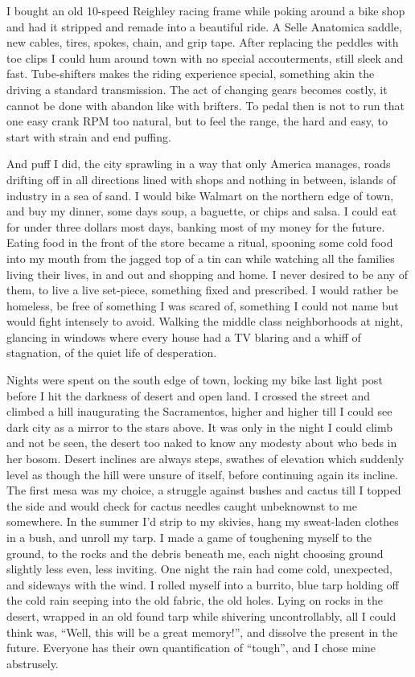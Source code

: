 \documentclass[ebook, 10pt, openright, onecolumn]{memoir}
\begin{document}
I bought an old 10-speed Reighley racing frame while poking around a bike shop
and had it stripped and remade into a beautiful ride.  A Selle Anatomica saddle,
new cables, tires, spokes, chain, and grip tape.  After replacing the peddles
with toe clips I could hum around town with no special accouterments, still
sleek and fast. Tube-shifters makes the riding experience special, something
akin the driving a standard transmission.  The act of changing gears becomes
costly, it cannot be done with abandon like with brifters.  To pedal then is not
to run that one easy crank RPM too natural, but to feel the range, the hard and
easy, to start with strain and end puffing.

And puff I did, the city sprawling in a way that only America manages, roads
drifting off in all directions lined with shops and nothing in between, islands
of industry in a sea of sand.  I would bike Walmart on the northern edge of
town, and buy my dinner, some days soup, a baguette, or chips and salsa.  I
could eat for under three dollars most days, banking most of my money for the
future.  Eating food in the front of the store became a ritual, spooning some
cold food into my mouth from the jagged top of a tin can while watching all the
families living their lives, in and out and shopping and home.  I never desired
to be any of them, to live a live set-piece, something fixed and prescribed.  I
would rather be homeless, be free of something I was scared of, something I
could not name but would fight intensely to avoid.  Walking the middle class
neighborhoods at night, glancing in windows where every house had a TV blaring
and a whiff of stagnation, of the quiet life of desperation.  

Nights were spent on the south edge of town, locking my bike last light post
before I hit the darkness of desert and open land.  I crossed the street and
climbed a hill inaugurating the Sacramentos, higher and higher till I could see
dark city as a mirror to the stars above.  It was only in the night I could
climb and not be seen, the desert too naked to know any modesty about who beds
in her bosom.  Desert inclines are always steps, swathes of elevation which
suddenly level as though the hill were unsure of itself, before continuing again
its incline.  The first mesa was my choice, a struggle against bushes and cactus
till I topped the side and would check for cactus needles caught unbeknownst to
me somewhere.  In the summer I'd strip to my skivies, hang my sweat-laden
clothes in a bush, and unroll my tarp.  I made a game of toughening myself to
the ground, to the rocks and the debris beneath me, each night choosing ground
slightly less even, less inviting.  One night the rain had come cold,
unexpected, and sideways with the wind.  I rolled myself into a burrito, blue
tarp holding off the cold rain seeping into the old fabric, the old holes.
Lying on rocks in the desert, wrapped in an old found tarp while shivering
uncontrollably, all I could think was, ``Well, this will be a great memory!'',
and dissolve the present in the future.  Everyone has their own quantification
of ``tough'', and I chose mine abstrusely.
\end{document}
